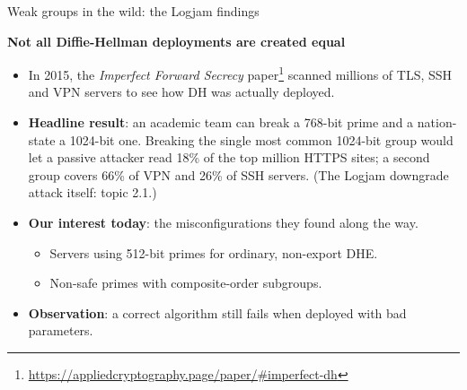 \ifdefined\PRESENTATION\else\PassOptionsToClass{handout}{beamer}\fi\documentclass[aspectratio=169, lualatex]{beamer}
\begin{document}
\begin{frame}{Weak groups in the wild: the Logjam findings}
	\begin{center}
		\Large\textbf{Not all Diffie-Hellman deployments are created equal}
	\end{center}
	\vspace{0.2cm}
	\begin{itemize}[<+->]
		\item In 2015, the \emph{Imperfect Forward Secrecy} paper\footnote{\url{https://appliedcryptography.page/paper/\#imperfect-dh}} scanned millions of TLS, SSH and VPN servers to see how DH was actually deployed.
		\item \textbf{Headline result}: an academic team can break a 768-bit prime and a nation-state a 1024-bit one. Breaking the single most common 1024-bit group would let a passive attacker read 18\% of the top million HTTPS sites; a second group covers 66\% of VPN and 26\% of SSH servers. (The Logjam downgrade attack itself: topic 2.1.)
		\item \textbf{Our interest today}: the misconfigurations they found along the way.
		      \begin{itemize}
			      \item Servers using 512-bit primes for ordinary, non-export DHE.
			      \item Non-safe primes with composite-order subgroups.
		      \end{itemize}
		\item \textbf{Observation}: a correct algorithm still fails when deployed with bad parameters.
	\end{itemize}
\end{frame}
\end{document}
